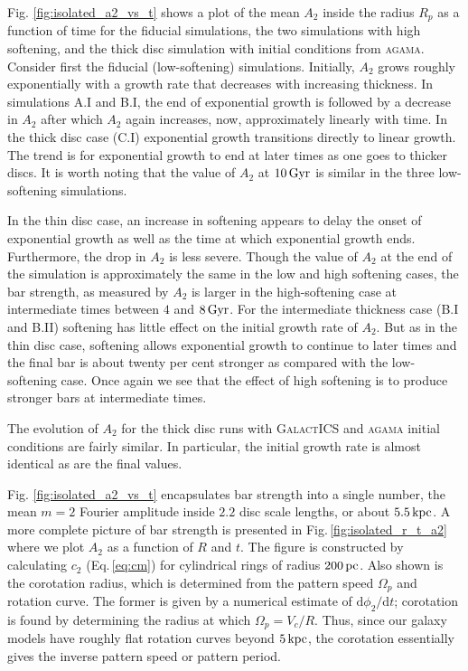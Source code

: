 Fig. \ref{fig:isolated_a2_vs_t} shows a plot of the mean $A_2$ inside
the radius $R_p$ as a function of time for the fiducial simulations,
the two simulations with high softening, and the thick disc simulation
with initial conditions from \textsc{agama}.  Consider first the
fiducial (low-softening) simulations.  Initially, $A_2$ grows roughly
exponentially with a growth rate that decreases with increasing
thickness.  In simulations A.I and B.I, the end of exponential growth
is followed by a decrease in $A_2$ after which $A_2$ again increases,
now, approximately linearly with time.  In the thick disc case (C.I)
exponential growth transitions directly to linear growth.  The trend
is for exponential growth to end at later times as one goes to thicker
discs.  It is worth noting that the value of $A_2$ at $10\,{\rm Gyr}$
is similar in the three low-softening simulations.

In the thin disc case, an increase in softening appears to delay the
onset of exponential growth as well as the time at which exponential
growth ends.  Furthermore, the drop in $A_2$ is less severe.  Though
the value of $A_2$ at the end of the simulation is approximately the
same in the low and high softening cases, the bar strength, as
measured by $A_2$ is larger in the high-softening case at intermediate
times between $4$ and $8\,{\rm Gyr}$.  For the intermediate thickness
case (B.I and B.II) softening has little effect on the initial
growth rate of $A_2$.  But as in the thin disc case, softening
allows exponential growth to continue to later times and the final bar
is about twenty per cent stronger as compared with the low-softening
case.  Once again we see that the effect of high softening is to
produce stronger bars at intermediate times.

The evolution of $A_2$ for the thick disc runs with \textsc{GalactICS}
and \textsc{agama} initial conditions are fairly similar.  In particular,
the initial growth rate is almost identical as are the final values.

Fig. \ref{fig:isolated_a2_vs_t} encapsulates bar strength into a
single number, the mean $m=2$ Fourier amplitude inside $2.2$ disc
scale lengths, or about $5.5\,{\rm kpc}$.  A more complete picture of
bar strength is presented in Fig.\,\ref{fig:isolated_r_t_a2} where we
plot $A_2$ as a function of $R$ and $t$. The figure is constructed by
calculating $c_2$ (Eq.\,\ref{eq:cm}) for cylindrical rings of radius
$200\,{\rm pc}$.  Also shown is the corotation radius, which is
determined from the pattern speed $\Omega_p$ and rotation curve. The
former is given by a numerical estimate of ${\text{d}
  \phi_2}/{\text{d} t}$; corotation is found by determining the radius
at which $\Omega_p = V_c/R$.  Thus, since our galaxy models have
roughly flat rotation curves beyond $5\,{\rm kpc}$, the corotation
essentially gives the inverse pattern speed or pattern period.

